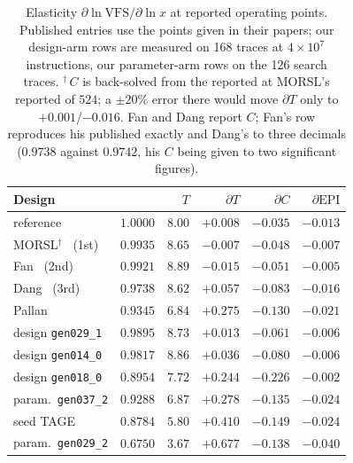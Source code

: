\documentclass[conference]{IEEEtran}
\newcommand{\vfs}{\text{VFS}}
\newcommand{\epi}{\text{EPI}}
\begin{document}
\begin{table}[tb]
\caption{Elasticity $\partial\ln\vfs{}/\partial\ln x$ at reported operating
points. Published entries use the points given in their papers; our design-arm
rows are measured on 168 traces at $4\times10^7$ instructions, our parameter-arm
rows on the 126 search traces. $^\dagger$\,$C$ is back-solved from the reported
\vfs{} at MORSL's reported \epi{} of $524$; a $\pm20\%$ error there would move
$\partial T$ only to $+0.001$/$-0.016$. Fan and Dang report $C$; Fan's row
reproduces his published \vfs{} exactly and Dang's to three decimals ($0.9738$
against $0.9742$, his $C$ being given to two significant figures).}
\label{tab:elast}
\centering\scriptsize
\begin{tabular}{@{}lrrrrr@{}}
\toprule
Design & \vfs{} & $T$ & $\partial T$ & $\partial C$ & $\partial\epi{}$ \\
\midrule
reference & $1.0000$ & $8.00$ & $+0.008$ & $-0.035$ & $-0.013$ \\
\midrule
MORSL$^\dagger$~\cite{koizumi} (1st) & $0.9935$ & $8.65$ & $-0.007$ & $-0.048$ & $-0.007$ \\
Fan~\cite{fan} (2nd) & $0.9921$ & $8.89$ & $-0.015$ & $-0.051$ & $-0.005$ \\
Dang~\cite{dang} (3rd) & $0.9738$ & $8.62$ & $+0.057$ & $-0.083$ & $-0.016$ \\
Pallan~\cite{pallan} & $0.9345$ & $6.84$ & $+0.275$ & $-0.130$ & $-0.021$ \\
\midrule
design \texttt{gen029\_1} & $0.9895$ & $8.73$ & $+0.013$ & $-0.061$ & $-0.006$ \\
design \texttt{gen014\_0} & $0.9817$ & $8.86$ & $+0.036$ & $-0.080$ & $-0.006$ \\
design \texttt{gen018\_0} & $0.8954$ & $7.72$ & $+0.244$ & $-0.226$ & $-0.002$ \\
\midrule
param.\ \texttt{gen037\_2} & $0.9288$ & $6.87$ & $+0.278$ & $-0.135$ & $-0.024$ \\
seed TAGE & $0.8784$ & $5.80$ & $+0.410$ & $-0.149$ & $-0.024$ \\
param.\ \texttt{gen029\_2} & $0.6750$ & $3.67$ & $+0.677$ & $-0.138$ & $-0.040$ \\
\bottomrule
\end{tabular}
\end{table}
\end{document}
